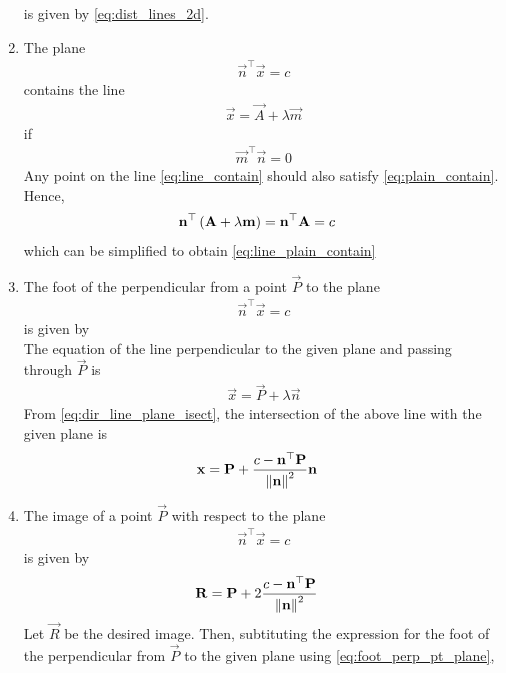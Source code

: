 \documentclass[journal,12pt,twocolumn]{IEEEtran}
\renewcommand\thesection{\arabic{section}}
\renewcommand\thesubsection{\thesection.\arabic{subsection}}
\begin{document}
\begin{enumerate}[label=\thesubsection.\arabic*.,ref=\thesubsection.\theenumi]
	is given by 
	\eqref{eq:dist_lines_2d}.
\item The plane 
		\begin{align}
		\vec{n}^{\top}
			\vec{x} = c
			\label{eq:plain_contain}
		\end{align}
		contains the line 
		\begin{align}
			\vec{x} = \vec{A}+\lambda \vec{m}
			\label{eq:line_contain}
		\end{align}
		if 
		\begin{align}
		\vec{m}^{\top}\vec{n} = 0
			\label{eq:line_plain_contain}
		\end{align}
		\solution Any point on the line 
			\eqref{eq:line_contain}
			should also satisfy 
			\eqref{eq:plain_contain}.  Hence, 
		\begin{align}
			\mathbf{n}^{\top}\left(\mathbf{A}+\lambda \mathbf{m}\right) &= \mathbf{n}^{\top}\mathbf{A}=c
		\end{align}
		which can be simplified to obtain
			\eqref{eq:line_plain_contain}
		\item The foot of the perpendicular from a point $\vec{P}$ to the plane 
		\begin{align}
			\vec{n}^{\top}\vec{x} =c
		\end{align}
		is given by 
		\\
		\solution The equation of the line perpendicular to the given plane and passing through $\vec{P}$ is 
		\begin{align}
			\vec{x} = \vec{P} + \lambda 	\vec{n}
		\end{align}
		From 
	\eqref{eq:dir_line_plane_isect}, the intersection of the above line with the given plane is 
\begin{align}
	\mathbf{x} &= \mathbf{P} + \frac{c - \mathbf{n}^{\top}\mathbf{P}}{\left\lVert\mathbf{n}\right\rVert^2}
\mathbf{n}
	\label{eq:foot_perp_pt_plane}
\end{align}
\item The image of a point $\vec{P}$ with respect to the plane 
		\begin{align}
			\vec{n}^{\top}\vec{x} =c
		\end{align}
		is given by 
		\begin{align}
			\mathbf{R} &=
	  \mathbf{P} + 2\frac{c - \mathbf{n}^{\top}\mathbf{P}}{\left\lVert\mathbf{n}\right\rVert^2}
			\label{eq:image_pt_plane}
		\end{align}
		\solution Let $\vec{R}$ be the desired image.  Then, subtituting the expression for the  foot of the perpendicular from $\vec{P}$ to the given plane using 
	\eqref{eq:foot_perp_pt_plane},
		\begin{align}

\end{align}
\end{enumerate}
\end{document}

